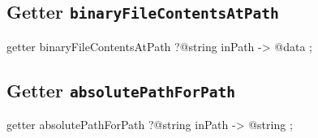 \subsection{Getter \texttt{binaryFileContentsAtPath}}

\begin{galgas}
getter binaryFileContentsAtPath ?@string inPath -> @data ;
\end{galgas}










\subsection{Getter \texttt{absolutePathForPath}}

\begin{galgas}
getter absolutePathForPath ?@string inPath -> @string ;
\end{galgas}



